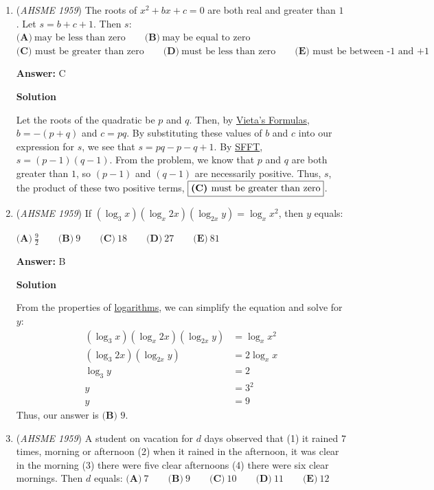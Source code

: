 \begin{enumerate}
 


	\item (\textit{AHSME 1959}) The roots of $x^2+bx+c=0$ are both real and greater than $1$. Let $s=b+c+1$. Then $s$:
$\textbf{(A)}\ \text{may be less than zero}\qquad\textbf{(B)}\ \text{may be equal to zero}\qquad$
$\textbf{(C)} \text{ must be greater than zero}\qquad\textbf{(D)}\ \text{must be less than zero}\qquad  \textbf{(E)}\text{ must be between -1 and +1}$

 \textbf{Answer: }C



\textbf{Solution}

Let the roots of the quadratic be $p$ and $q$. Then, by \href{https://artofproblemsolving.com/wiki/index.php?title=Vieta\%27s\_Formulas}{Vieta's Formulas}, $b=-(p+q)$ and $c=pq$. By substituting these values of $b$ and $c$ into our expression for $s$, we see that $s=pq-p-q+1$. By \href{https://artofproblemsolving.com/wiki/index.php?title=SFFT}{SFFT}, $s=(p-1)(q-1)$. From the problem, we know that $p$ and $q$ are both greater than $1$, so $(p-1)$ and $(q-1)$ are necessarily positive. Thus, $s$, the product of these two positive terms, $\fbox{\textbf{(C) }must be greater than zero}$.

 


	\item (\textit{AHSME 1959}) If $\left(\log_3 x\right)\left(\log_x 2x\right)\left( \log_{2x} y\right)=\log_{x}x^2$, then $y$ equals:


 $\textbf{(A)}\ \frac92\qquad\textbf{(B)}\ 9\qquad\textbf{(C)}\ 18\qquad\textbf{(D)}\ 27\qquad\textbf{(E)}\ 81$

 \textbf{Answer: }B



\textbf{Solution}

From the properties of \href{https://artofproblemsolving.com/wiki/index.php?title=Logarithms}{logarithms}, we can simplify the equation and solve for $y$:\begin{align*}(\log_3 x)(\log_x 2x)(\log_{2x} y) &= \log_{x}x^2 \\(\log_3 2x)(\log_{2x} y) &= 2\log_x x \\\log_3 y &= 2 \\y &= 3^2 \\y &= 9\end{align*}
Thus, our answer is $\boxed{\textbf{(B) }9}$.

 


	\item (\textit{AHSME 1959}) A student on vacation for $d$ days observed that (1) it rained $7$ times, morning or afternoon (2) when it rained in the afternoon, 
it was clear in the morning (3) there were five clear afternoons (4) there were six clear mornings. Then $d$ equals:
$\textbf{(A)}\ 7\qquad\textbf{(B)}\ 9\qquad\textbf{(C)}\ 10\qquad\textbf{(D)}\ 11\qquad\textbf{(E)}\ 12$


\end{enumerate}
